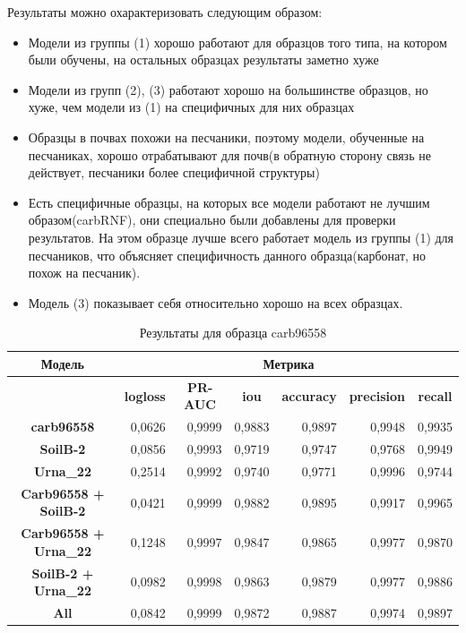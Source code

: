\documentclass[14pt, a4paper, oneside, bold]{extarticle}
\begin{document}
Результаты можно охарактеризовать следующим образом:
\begin{itemize}
	\item Модели из группы (1) хорошо работают для образцов того типа, на котором были обучены, на остальных образцах результаты заметно хуже
	
	\item Модели из групп (2), (3) работают хорошо на большинстве образцов, но хуже, чем модели из (1) на специфичных для них образцах
	
	\item Образцы в почвах похожи на песчаники, поэтому модели, обученные на песчаниках, хорошо отрабатывают для почв(в обратную сторону связь не действует, песчаники более специфичной структуры)
	
	\item Есть специфичные образцы, на которых все модели работают не лучшим образом(carbRNF), они специально были добавлены для проверки результатов. На этом образце лучше всего работает модель из группы (1) для песчаников, что объясняет специфичность данного образца(карбонат, но похож на песчаник).
	
	\item Модель (3) показывает себя относительно хорошо на всех образцах.
	
\end{itemize}

\begin{table}[htbp]
\small
\begin{tabular}{|c|r|r|r|r|r|r|}
\hline
\textbf{Модель} & \multicolumn{ 6}{c|}{\textbf{Метрика}} \\ \hline
\textbf{} & \multicolumn{1}{c|}{\textbf{logloss}} & \multicolumn{1}{c|}{\textbf{PR-AUC}} & \multicolumn{1}{c|}{\textbf{iou}} & \multicolumn{1}{c|}{\textbf{accuracy}} & \multicolumn{1}{c|}{\textbf{precision}} & \multicolumn{1}{c|}{\textbf{recall}} \\ \hline
\textbf{carb96558} & 0,0626 & 0,9999 & 0,9883 & 0,9897 & 0,9948 & 0,9935 \\ \hline
\textbf{SoilB-2} & 0,0856 & 0,9993 & 0,9719 & 0,9747 & 0,9768 & 0,9949 \\ \hline
\textbf{Urna\_22} & 0,2514 & 0,9992 & 0,9740 & 0,9771 & 0,9996 & 0,9744 \\ \hline
\textbf{Carb96558 + SoilB-2} & 0,0421 & 0,9999 & 0,9882 & 0,9895 & 0,9917 & 0,9965 \\ \hline
\textbf{Carb96558 + Urna\_22} & 0,1248 & 0,9997 & 0,9847 & 0,9865 & 0,9977 & 0,9870 \\ \hline
\textbf{SoilB-2 + Urna\_22} & 0,0982 & 0,9998 & 0,9863 & 0,9879 & 0,9977 & 0,9886 \\ \hline
\textbf{All} & 0,0842 & 0,9999 & 0,9872 & 0,9887 & 0,9974 & 0,9897 \\ \hline
\end{tabular}
\caption{Результаты для образца carb96558}
\label{carb96558}
\end{table}
\end{document}
